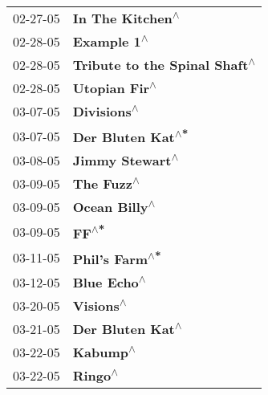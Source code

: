 \begin{supertabular}{p{0.25\columnwidth}p{0.75\columnwidth}}
 02-27-05 &                                                           \textbf{In The Kitchen\textsuperscript{$\wedge$}} \\
 02-28-05 &                                                                \textbf{Example 1\textsuperscript{$\wedge$}} \\
 02-28-05 &                                              \textbf{Tribute to the Spinal Shaft\textsuperscript{$\wedge$}} \\
 02-28-05 &                                                              \textbf{Utopian Fir\textsuperscript{$\wedge$}} \\
 03-07-05 &                                                                \textbf{Divisions\textsuperscript{$\wedge$}} \\
 03-07-05 &                                                          \textbf{Der Bluten Kat\textsuperscript{$\wedge$*}} \\
 03-08-05 &                                                            \textbf{Jimmy Stewart\textsuperscript{$\wedge$}} \\
 03-09-05 &                                                                 \textbf{The Fuzz\textsuperscript{$\wedge$}} \\
 03-09-05 &                                                              \textbf{Ocean Billy\textsuperscript{$\wedge$}} \\
 03-09-05 &                                                                      \textbf{FF\textsuperscript{$\wedge$*}} \\
 03-11-05 &                                                             \textbf{Phil's Farm\textsuperscript{$\wedge$*}} \\
 03-12-05 &                                                                \textbf{Blue Echo\textsuperscript{$\wedge$}} \\
 03-20-05 &                                                                  \textbf{Visions\textsuperscript{$\wedge$}} \\
 03-21-05 &                                                           \textbf{Der Bluten Kat\textsuperscript{$\wedge$}} \\
 03-22-05 &                                                                   \textbf{Kabump\textsuperscript{$\wedge$}} \\
 03-22-05 &                                                                    \textbf{Ringo\textsuperscript{$\wedge$}} \\

\end{supertabular}
